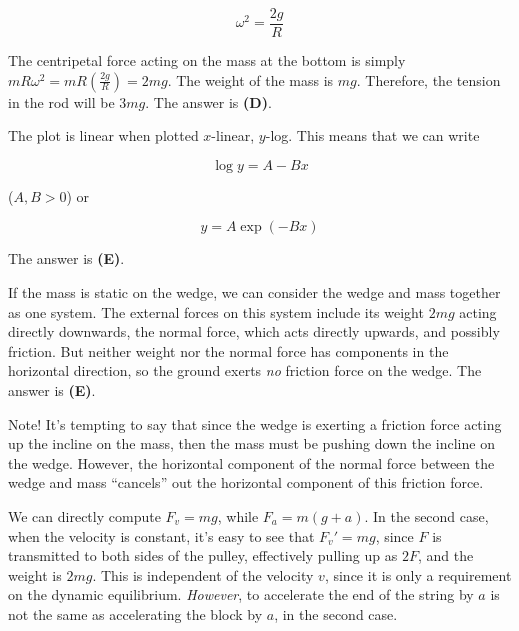 \documentclass[12pt]{article}
\begin{document}
$$\omega^2 = \frac{2 g}{R}$$

The centripetal force acting on the mass at the bottom is simply $m R \omega^2 = m R \left( \frac{2 g}{R} \right) = 2 m g$. The weight of the mass is $m g$. Therefore, the tension in the rod will be $3 m g$. The answer is \textbf{(D)}.


\vspace{2 \baselineskip}



The plot is linear when plotted $x$-linear, $y$-log. This means that we can write

$$\log y = A - B x$$

($A, B > 0$) or

$$y = A \exp (-B x)$$

The answer is \textbf{(E)}.


\vspace{2 \baselineskip}



If the mass is static on the wedge, we can consider the wedge and mass together as one system. The external forces on this system include its weight $2 m g$ acting directly downwards, the normal force, which acts directly upwards, and possibly friction. But neither weight nor the normal force has components in the horizontal direction, so the ground exerts \textit{no} friction force on the wedge. The answer is \textbf{(E)}.

Note! It's tempting to say that since the wedge is exerting a friction force acting up the incline on the mass, then the mass must be pushing down the incline on the wedge. However, the horizontal component of the normal force between the wedge and mass ``cancels'' out the horizontal component of this friction force.


\vspace{2 \baselineskip}



We can directly compute $F_v = m g$, while $F_a = m (g + a)$. In the second case, when the velocity is constant, it's easy to see that $F_v' = m g$, since $F$ is transmitted to both sides of the pulley, effectively pulling up as $2 F$, and the weight is $2 m g$. This is independent of the velocity $v$, since it is only a requirement on the dynamic equilibrium. \textit{However}, to accelerate the end of the string by $a$ is not the same as accelerating the block by $a$, in the second case.
\end{document}
